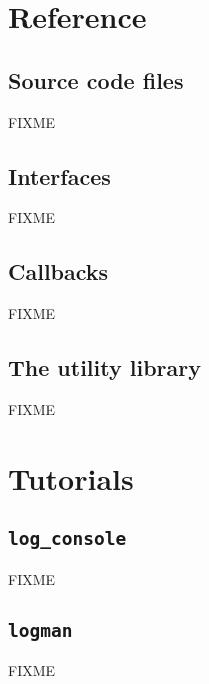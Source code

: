 \documentclass{article}
\begin{document}
\section{Reference}

\subsection{Source code files}

FIXME

\subsection{Interfaces}

FIXME

\subsection{Callbacks}

FIXME

\subsection{The utility library}

FIXME




\section{Tutorials}

\subsection{\texttt{log\_console}}

FIXME

\subsection{\texttt{logman}}

FIXME
\end{document}
